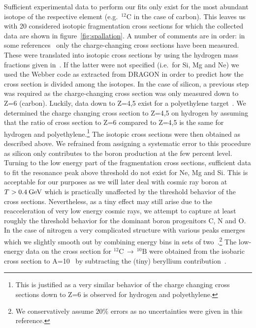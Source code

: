\documentclass[a4paper,11pt]{article}
\newcommand{\eVdist}{\kern-0.06em}
\newcommand{\gev}{\:\text{Ge\eVdist V}}
\begin{document}
Sufficient experimental data to perform our fits only exist for the most abundant isotope of the respective element (e.g.\ $^{12}$C in the case of carbon). This leaves us with 20 considered isotopic fragmentation cross sections for which the collected data are shown in figure~\ref{fig:spallation}. A number of comments are in order: in some references~\cite{Webber:1990kb,Zeitlin:2007sm,Zeitlin:2011qg,Zeitlin:2001ye} only the charge-changing cross sections have been measured. These were translated into isotopic cross sections by using the hydrogen mass fractions given in~\cite{Webber:1990kc}. If the latter were not specified (i.e.\ for Si, Mg and Ne) we used the Webber code as extracted from DRAGON in order to predict how the cross section is divided among the isotopes. In the case of silicon, a previous step was required as the charge-changing cross section was only measured down to Z=6 (carbon). Luckily, data down to Z=4,5 exist for a polyethylene target~\cite{Gupta:2013}. We determined the charge changing cross section to Z=4,5 on hydrogen by assuming that the ratio of cross section to Z=6 compared to Z=4,5 is the same for hydrogen and polyethylene.\footnote{This is justified as a very similar behavior of the charge changing cross sections down to Z=6 is observed for hydrogen and polyethylene.} The isotopic cross sections were then obtained as described above. We refrained from assigning a systematic error to this procedure as silicon only contributes to the boron production at the few percent level. 
Turning to the low energy part of the fragmentation cross sections, sufficient data to fit the resonance peak above threshold do not exist for Ne, Mg and Si. This is acceptable for our purposes as we will later deal with cosmic ray boron at $T>0.4\gev$ which is practically unaffected by the threshold behavior of the cross sections. Nevertheless, as a tiny effect may still arise due to the reacceleration of very low energy cosmic rays, we attempt to capture at least roughly the threshold behavior for the dominant boron progenitors C, N and O. In the case of nitrogen a very complicated structure with various peaks emerges which we slightly smooth out by combining energy bins in sets of two~\cite{Bodansky:1975}.\footnote{We conservatively assume $20\%$ errors as no uncertainties were given in this reference.} The low-energy data on the cross section for $^{12}\text{C}\,\rightarrow\,^{10}\text{B}$ were obtained from the isobaric cross section to A=10~\cite{Davids:1970wh,Roche:1976zz} by subtracting the (tiny) beryllium contribution~\cite{Bodemann:1993}.
\end{document}
